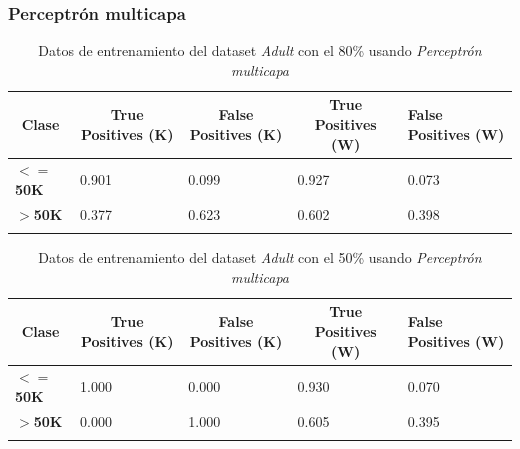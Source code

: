 \documentclass[10pt,a4paper]{article}
\begin{document}
\subsubsection{Perceptrón multicapa}
\begin{table}[h]
\begin{tabular}{lllll}
\hline
\multicolumn{1}{|c|}{\textbf{Clase}} & \multicolumn{1}{c|}{\textbf{True Positives (K)}} & \multicolumn{1}{c|}{\textbf{False Positives (K)}} & \multicolumn{1}{c|}{\textbf{True Positives (W)}} & \multicolumn{1}{l|}{\textbf{False Positives (W)}} \\ \hline
\multicolumn{1}{|l|}{\textbf{$<=$50K}} & \multicolumn{1}{l|}{0.901}          & \multicolumn{1}{l|}{0.099}          & \multicolumn{1}{l|}{0.927}          & \multicolumn{1}{l|}{0.073} \\ \hline
\multicolumn{1}{|l|}{\textbf{$>$50K}} & \multicolumn{1}{l|}{0.377}          & \multicolumn{1}{l|}{0.623}          & \multicolumn{1}{l|}{0.602}          & \multicolumn{1}{l|}{0.398} \\ \hline
\textbf{}                       &                                &                                &                                &                      
\end{tabular}
\caption{Datos de entrenamiento del dataset \emph{Adult} con el 80\% usando \emph{Perceptrón multicapa}}
\label{tab:adult_perceptron_80}
\end{table}

\begin{table}[h!]
\begin{tabular}{lllll}
\hline
\multicolumn{1}{|c|}{\textbf{Clase}} & \multicolumn{1}{c|}{\textbf{True Positives (K)}} & \multicolumn{1}{c|}{\textbf{False Positives (K)}} & \multicolumn{1}{c|}{\textbf{True Positives (W)}} & \multicolumn{1}{l|}{\textbf{False Positives (W)}} \\ \hline
\multicolumn{1}{|l|}{\textbf{$<=$50K}} & \multicolumn{1}{l|}{1.000}          & \multicolumn{1}{l|}{0.000}          & \multicolumn{1}{l|}{0.930}          & \multicolumn{1}{l|}{0.070} \\ \hline
\multicolumn{1}{|l|}{\textbf{$>$50K}} & \multicolumn{1}{l|}{0.000}          & \multicolumn{1}{l|}{1.000}          & \multicolumn{1}{l|}{0.605}          & \multicolumn{1}{l|}{0.395} \\ \hline
\textbf{}                       &                                &                                &                                &                      
\end{tabular}
\caption{Datos de entrenamiento del dataset \emph{Adult} con el 50\% usando \emph{Perceptrón multicapa}}
\label{tab:adult_perceptron_50}
\end{table}
\end{document}

